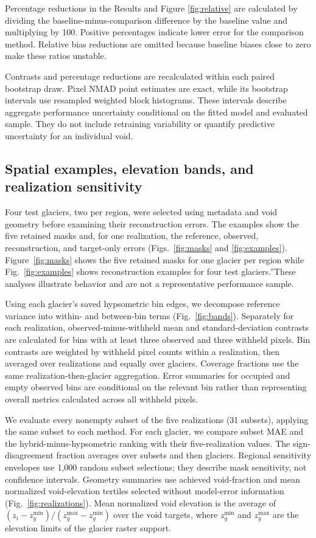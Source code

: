 \documentclass[tc,manuscript]{copernicus}
\begin{document}
Percentage reductions in the Results and Figure \ref{fig:relative} are calculated by dividing the baseline-minus-comparison difference by the baseline value and multiplying by 100. Positive percentages indicate lower error for the comparison method. Relative bias reductions are omitted because baseline biases close to zero make these ratios unstable.

Contrasts and percentage reductions are recalculated within each paired bootstrap draw. Pixel NMAD point estimates are exact, while its bootstrap intervals use resampled weighted block histograms. These intervals describe aggregate performance uncertainty conditional on the fitted model and evaluated sample. They do not include retraining variability or quantify predictive uncertainty for an individual void.

\subsection{Spatial examples, elevation bands, and realization sensitivity}\label{sec:diagnostics}
Four test glaciers, two per region, were selected using metadata and void geometry before examining their reconstruction errors. The examples show the five retained masks and, for one realization, the reference, observed, reconstruction, and target-only errors (Figs.~\ref{fig:masks} and \ref{fig:examples}). Figure~\ref{fig:masks} shows the five retained masks for one glacier per region while Fig.~\ref{fig:examples} shows reconstruction examples for four test glaciers.”These analyses illustrate behavior and are not a representative performance sample.

Using each glacier's saved hypsometric bin edges, we decompose reference variance into within- and between-bin terms (Fig.~\ref{fig:bands}). Separately for each realization, observed-minus-withheld mean and standard-deviation contrasts are calculated for bins with at least three observed and three withheld pixels. Bin contrasts are weighted by withheld pixel counts within a realization, then averaged over realizations and equally over glaciers. Coverage fractions use the same realization-then-glacier aggregation. Error summaries for occupied and empty observed bins are conditional on the relevant bin rather than representing overall metrics calculated across all withheld pixels.

We evaluate every nonempty subset of the five realizations (31 subsets), applying the same subset to each method. For each glacier, we compare subset MAE and the hybrid-minus-hypsometric ranking with their five-realization values. The sign-disagreement fraction averages over subsets and then glaciers. Regional sensitivity envelopes use 1,000 random subset selections; they describe mask sensitivity, not confidence intervals. Geometry summaries use achieved void-fraction and mean normalized void-elevation tertiles selected without model-error information (Fig.~\ref{fig:realizations}). Mean normalized void elevation is the average of $(z_i-z_g^{\min})/(z_g^{\max}-z_g^{\min})$ over the void targets, where $z_g^{\min}$ and $z_g^{\max}$ are the elevation limits of the glacier raster support.
\end{document}

